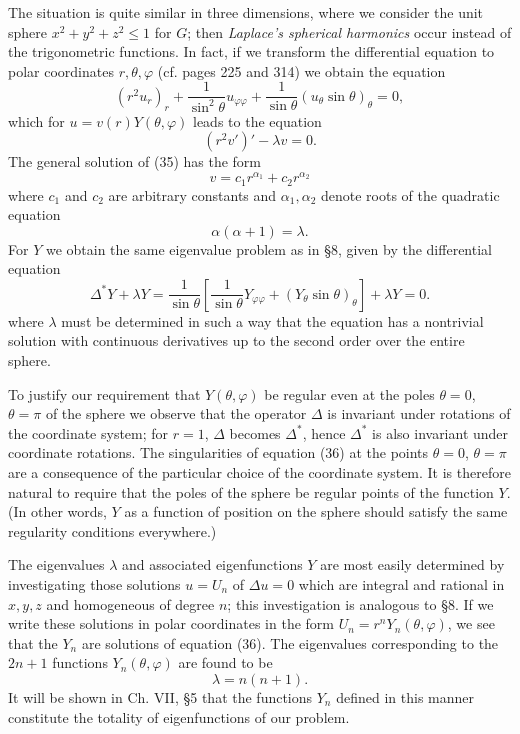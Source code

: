 The situation is quite similar in three dimensions, where we consider the unit sphere $x^2+y^2+z^2\le1$ for $G$; then \emph{Laplace's spherical harmonics} occur instead of the trigonometric functions. In fact, if we transform the differential equation to polar coordinates $r,\theta,\varphi$ (cf. pages 225 and 314) we obtain the equation
\[
(r^2u_r)_r+\frac1{\sin^2\theta}u_{\varphi\varphi}
 +\frac1{\sin\theta}(u_\theta\sin\theta)_\theta=0,
\]
which for $u=v(r)Y(\theta,\varphi)$ leads to the equation
\begin{equation}
(r^2v')'-\lambda v=0.
\tag{35}
\end{equation}
The general solution of (35) has the form
\[
v=c_1r^{\alpha_1}+c_2r^{\alpha_2}
\]
where $c_1$ and $c_2$ are arbitrary constants and $\alpha_1,\alpha_2$ denote roots of the quadratic equation
\[
\alpha(\alpha+1)=\lambda.
\]
For $Y$ we obtain the same eigenvalue problem as in \S8, given by the differential equation
\begin{equation}
\Delta^*Y+\lambda Y
=\frac1{\sin\theta}\left[\frac1{\sin\theta}Y_{\varphi\varphi}+(Y_\theta\sin\theta)_\theta\right]+\lambda Y=0.
\tag{36}
\end{equation}
where $\lambda$ must be determined in such a way that the equation has a nontrivial solution with continuous derivatives up to the second order over the entire sphere.

To justify our requirement that $Y(\theta,\varphi)$ be regular even at the poles $\theta=0$, $\theta=\pi$ of the sphere we observe that the operator $\Delta$ is invariant under rotations of the coordinate system; for $r=1$, $\Delta$ becomes $\Delta^*$, hence $\Delta^*$ is also invariant under coordinate rotations. The singularities of equation (36) at the points $\theta=0$, $\theta=\pi$ are a consequence of the particular choice of the coordinate system. It is therefore natural to require that the poles of the sphere be regular points of the function $Y$. (In other words, $Y$ as a function of position on the sphere should satisfy the same regularity conditions everywhere.)

The eigenvalues $\lambda$ and associated eigenfunctions $Y$ are most easily determined by investigating those solutions $u=U_n$ of $\Delta u=0$ which are integral and rational in $x,y,z$ and homogeneous of degree $n$; this investigation is analogous to \S8. If we write these solutions in polar coordinates in the form $U_n=r^nY_n(\theta,\varphi)$, we see that the $Y_n$ are solutions of equation (36). The eigenvalues corresponding to the $2n+1$ functions $Y_n(\theta,\varphi)$ are found to be
\[
\lambda=n(n+1).
\]
It will be shown in Ch. VII, \S5 that the functions $Y_n$ defined in this manner constitute the totality of eigenfunctions of our problem.

